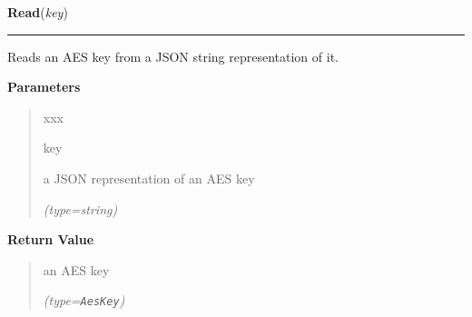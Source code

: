     \label{keyczar:keys:AesKey:Read}

    \vspace{0.5ex}

\hspace{.8\funcindent}\begin{boxedminipage}{\funcwidth}

    \raggedright \textbf{Read}(\textit{key})

    \vspace{-1.5ex}

    \rule{\textwidth}{0.5\fboxrule}
\setlength{\parskip}{2ex}
    Reads an AES key from a JSON string representation of it.

\setlength{\parskip}{1ex}
      \textbf{Parameters}
      \vspace{-1ex}

      \begin{quote}
        \begin{Ventry}{xxx}

          \item[key]

          a JSON representation of an AES key

            {\it (type=string)}

        \end{Ventry}

      \end{quote}

      \textbf{Return Value}
    \vspace{-1ex}

      \begin{quote}
      an AES key

      {\it (type=\texttt{AesKey})}

      \end{quote}

    \end{boxedminipage}

    \label{keyczar:keys:AesKey:Encrypt}

    \vspace{0.5ex}

